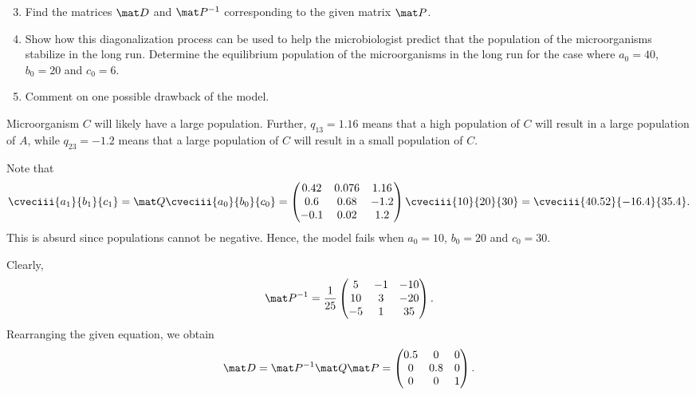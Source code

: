 \begin{problem}
    \begin{enumerate}
        \setcounter{enumi}{2}
        \item Find the matrices $\mat D$ and $\mat P^{-1}$ corresponding to the given matrix $\mat P$.
        \item Show how this diagonalization process can be used to help the microbiologist predict that the population of the microorganisms stabilize in the long run. Determine the equilibrium population of the microorganisms in the long run for the case where $a_0 = 40$, $b_0 = 20$ and $c_0 = 6$.
        \item Comment on one possible drawback of the model.
    \end{enumerate}
\end{problem}
\begin{solution}
    \begin{ppart}
        Microorganism $C$ will likely have a large population. Further, $q_{13} = 1.16$ means that a high population of $C$ will result in a large population of $A$, while $q_{23} = -1.2$ means that a large population of $C$ will result in a small population of $C$.
    \end{ppart}
    \begin{ppart}
        Note that \[\cveciii{a_1}{b_1}{c_1} = \mat Q\cveciii{a_{0}}{b_{0}}{c_{0}} = \begin{pmatrix}0.42 & 0.076 & 1.16 \\ 0.6 & 0.68 & -1.2 \\ -0.1 & 0.02 & 1.2\end{pmatrix} \cveciii{10}{20}{30} = \cveciii{40.52}{-16.4}{35.4}.\] This is absurd since populations cannot be negative. Hence, the model fails when $a_0 = 10$, $b_0 = 20$ and $c_0 = 30$.
    \end{ppart}
    \begin{ppart}
        Clearly, \[\mat P^{-1} = \frac1{25} \begin{pmatrix}5 & -1 & -10 \\ 10 & 3 & -20 \\ -5 & 1 & 35\end{pmatrix}.\] Rearranging the given equation, we obtain \[\mat D = \mat P^{-1} \mat Q \mat P = \begin{pmatrix}0.5 & 0 & 0 \\ 0 & 0.8 & 0 \\ 0 & 0 & 1\end{pmatrix}.\]
    \end{ppart}
    \begin{ppart}

\end{ppart}
\end{solution}
